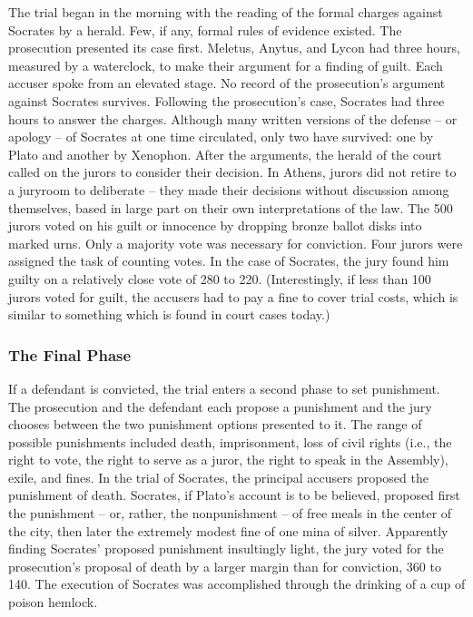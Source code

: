 The trial began in the morning with the reading of the formal charges against Socrates by a herald. Few, if any, formal rules of evidence existed. The prosecution presented its case first. Meletus, Anytus, and Lycon had three hours, measured by a waterclock, to make their argument for a finding of guilt. Each accuser spoke from an elevated stage. No record of the prosecution's argument against Socrates survives. Following the prosecution's case, Socrates had three hours to answer the charges. Although many written versions of the defense – or apology – of Socrates at one time circulated, only two have survived: one by Plato and another by Xenophon. After the arguments, the herald of the court called on the jurors to consider their decision. In Athens, jurors did not retire to a juryroom to deliberate – they made their decisions without discussion among themselves, based in large part on their own interpretations of the law. The 500 jurors voted on his guilt or innocence by dropping bronze ballot disks into marked urns. Only a majority vote was necessary for conviction. Four jurors were assigned the task of counting votes. In the case of Socrates, the jury found him guilty on a relatively close vote of 280 to 220. (Interestingly, if less than 100 jurors voted for guilt, the accusers had to pay a fine to cover trial costs, which is similar to something which is found in court cases today.)
\subsubsection{The Final Phase}

If a defendant is convicted, the trial enters a second phase to set punishment. The prosecution and the defendant each propose a punishment and the jury chooses between the two punishment options presented to it. The range of possible punishments included death, imprisonment, loss of civil rights (i.e., the right to vote, the right to serve as a juror, the right to speak in the Assembly), exile, and fines. In the trial of Socrates, the principal accusers proposed the punishment of death. Socrates, if Plato's account is to be believed, proposed first the punishment – or, rather, the nonpunishment – of free meals in the center of the city, then later the extremely modest fine of one mina of silver. Apparently finding Socrates' proposed punishment insultingly light, the jury voted for the prosecution's proposal of death by a larger margin than for conviction, 360 to 140. The execution of Socrates was accomplished through the drinking of a cup of poison hemlock.

